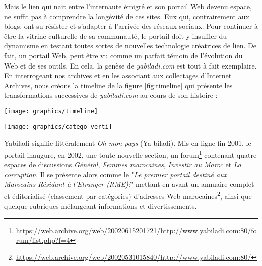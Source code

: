 \documentclass[symmetric,justified,marginals=raggedouter]{tufte-book}
\begin{document}
Mais le lien qui nait entre l'internaute émigré et son portail Web devenu espace, ne suffit pas à comprendre la longévité de ces sites. Eux qui, contrairement aux blogs, ont su résister et s'adapter à l'arrivée des réseaux sociaux. Pour continuer à être la vitrine culturelle de sa communauté, le portail doit y insuffler du dynamisme en testant toutes sortes de nouvelles technologie créatrices de lien. De fait, un portail Web, peut être vu comme un parfait témoin de l'évolution du Web et de ses outils. En cela, la genèse de \textit{yabiladi.com} est tout à fait exemplaire. En interrogeant nos archives et en les associant aux collectages d'Internet Archives, nous créons la timeline de la figure \ref{fig:timeline} qui présente les transformations successives de \textit{yabiladi.com} au cours de son histoire : 

\begin{figure*}
  \texttt{[image: graphics/timeline]}
  \caption{Timeline des évolutions successives de \textit{yabiladi.com}}
  \label{fig:timeline}
\end{figure*}

\begin{figure*}[hbtp]%
  \texttt{[image: graphics/catego-verti]}
  \caption{Évolution des catégories du forum de \textit{yabiladi.com}, par date d'apparition}
  \label{fig:categories}
\end{figure*}


\noindent Yabiladi signifie littéralement \textit{Oh mon pays} (Ya biladi). Mis en ligne fin 2001, le portail inaugure, en 2002, une toute nouvelle section, un forum\footnote{\url{https://web.archive.org/web/20020615201721/http://www.yabiladi.com:80/forum/list.php?f=4}} contenant quatre espaces de discussions \textit{Général}, \textit{Femmes marocaines}, \textit{Investir au Maroc} et \textit{La corruption}. Il se présente alors comme le "\textit{Le premier portail destiné aux Marocains Résidant à l'Etranger (RME)!}" mettant en avant un annuaire complet et éditorialisé (classement par catégories) d'adresses Web marocaines\footnote{\url{https://web.archive.org/web/20020531015840/http://www.yabiladi.com:80/}}, ainsi que quelque rubriques mélangeant informations et divertissements. 
\end{document}
